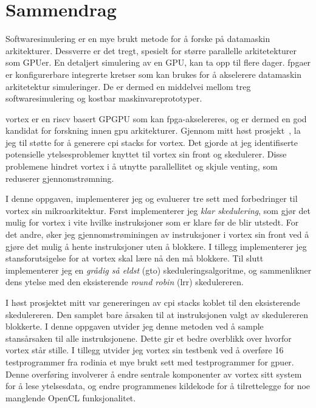 \chapter*{Sammendrag}

Softwaresimulering er en mye brukt metode for å forske på datamaskin arkitekturer. Dessverre er det tregt, spesielt for større parallelle arkitetekturer som GPUer. En detaljert simulering av en GPU, kan ta opp til flere dager. \acrshort{fpga}er er konfigurerbare integrerte kretser som kan brukes for å akselerere datamaskin arkitetektur simuleringer. De er dermed en middelvei mellom treg softwaresimulering og kostbar maskinvareprototyper.

\Gls{vortex} er en \Gls{riscv} basert GPGPU som kan \acrshort{fpga}-akselereres, og er dermed en god kandidat for forskning innen \acrshort{gpu} arkitekturer. Gjennom mitt høst prosjekt~\cite{Aurud_Project}, la jeg til støtte for å generere \acrshort{cpi} stacks for \Gls{vortex}. Det gjorde at jeg identifiserte potensielle ytelsesproblemer knyttet til \Gls{vortex} sin front og skedulerer. Disse problemene hindret \Gls{vortex} i å utnytte parallellitet og skjule venting, som reduserer gjennomstrømning.

I denne oppgaven, implementerer jeg og evaluerer tre sett med forbedringer til \Gls{vortex} sin mikroarkitektur. Først implementerer jeg \textit{klar skedulering}, som gjør det mulig for \Gls{vortex} i vite hvilke instruksjoner som er klare før de blir utstedt. For det andre, øker jeg gjennomstrøminingen av instruksjoner i \Gls{vortex} sin front ved å gjøre det mulig å hente instruksjoner uten å blokkere. I tillegg implementerer jeg stansforutsigelse for at \Gls{vortex} skal lære nå den må blokkere. Til slutt implementerer jeg en \textit{grådig så eldst} (\acrshort{gto}) skeduleringsalgoritme, og sammenlikner dens ytelse med den eksisterende \textit{round robin} (\acrshort{lrr}) skedulereren.

I høst prosjektet mitt var genereringen av \acrshort{cpi} stacks koblet til den eksisterende skedulereren. Den samplet bare årsaken til at instruksjonen valgt av skedulereren blokkerte. I denne oppgaven utvider jeg denne metoden ved å sample stansårsaken til alle instruksjonene. Dette gir et bedre overblikk over hvorfor \Gls{vortex} står stille. I tillegg utvider jeg \Gls{vortex} sin testbenk ved å overføre 16 testprogrammer fra \Gls{rodinia} et mye brukt sett med testprogrammer for \acrshort{gpu}er. Denne overføring involverer å endre sentrale komponenter av \Gls{vortex} sitt system for å lese ytelsesdata, og endre programmenes kildekode for å tilrettelegge for noe manglende OpenCL funksjonalitet.

